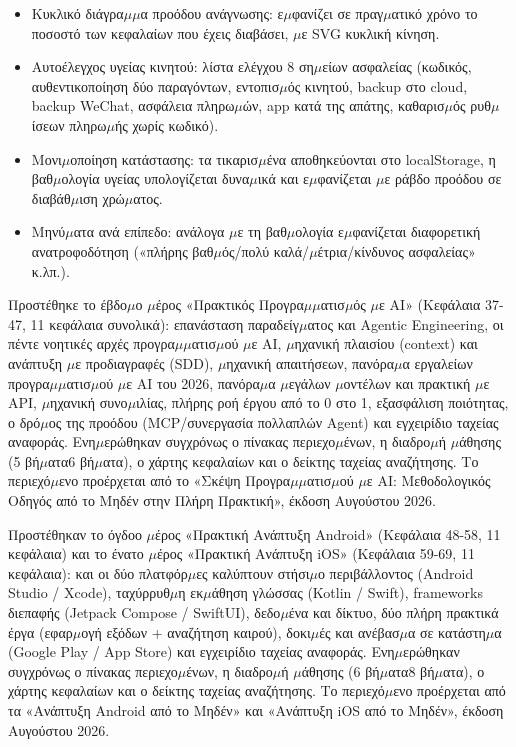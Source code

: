 \begin{itemize}
  \item Κυκλικό διάγρα$\mu$$\mu$α προόδου ανάγνωσης: ε$\mu$φανίζει σε πραγ$\mu$ατικό χρόνο το ποσοστό των κεφαλαίων που έχεις διαβάσει, $\mu$ε SVG κυκλική κίνηση.
  \item Αυτοέλεγχος υγείας κινητού: λίστα ελέγχου 8 ση$\mu$είων ασφαλείας (κωδικός, αυθεντικοποίηση δύο παραγόντων, εντοπισ$\mu$ός κινητού, backup στο cloud, backup WeChat, ασφάλεια πληρω$\mu$ών, app κατά της απάτης, καθαρισ$\mu$ός ρυθ$\mu$ίσεων πληρω$\mu$ής χωρίς κωδικό).
  \item Μονι$\mu$οποίηση κατάστασης: τα τικαρισ$\mu$ένα αποθηκεύονται στο localStorage, η βαθ$\mu$ολογία υγείας υπολογίζεται δυνα$\mu$ικά και ε$\mu$φανίζεται $\mu$ε ράβδο προόδου σε διαβάθ$\mu$ιση χρώ$\mu$ατος.
  \item Μηνύ$\mu$ατα ανά επίπεδο: ανάλογα $\mu$ε τη βαθ$\mu$ολογία ε$\mu$φανίζεται διαφορετική ανατροφοδότηση («πλήρης βαθ$\mu$ός/πολύ καλά/$\mu$έτρια/κίνδυνος ασφαλείας» κ.λπ.).
\end{itemize}


Προστέθηκε το έβδο$\mu$ο $\mu$έρος «Πρακτικός Προγρα$\mu$$\mu$ατισ$\mu$ός $\mu$ε AI» (Κεφάλαια 37-47, 11 κεφάλαια συνολικά): επανάσταση παραδείγ$\mu$ατος και Agentic Engineering, οι πέντε νοητικές αρχές προγρα$\mu$$\mu$ατισ$\mu$ού $\mu$ε AI, $\mu$ηχανική πλαισίου (context) και ανάπτυξη $\mu$ε προδιαγραφές (SDD), $\mu$ηχανική απαιτήσεων, πανόρα$\mu$α εργαλείων προγρα$\mu$$\mu$ατισ$\mu$ού $\mu$ε AI του 2026, πανόρα$\mu$α $\mu$εγάλων $\mu$οντέλων και πρακτική $\mu$ε API, $\mu$ηχανική συνο$\mu$ιλίας, πλήρης ροή έργου από το 0 στο 1, εξασφάλιση ποιότητας, ο δρό$\mu$ος της προόδου (MCP/συνεργασία πολλαπλών Agent) και εγχειρίδιο ταχείας αναφοράς. Ενη$\mu$ερώθηκαν συγχρόνως ο πίνακας περιεχο$\mu$ένων, η διαδρο$\mu$ή $\mu$άθησης (5 βή$\mu$ατα6 βή$\mu$ατα), ο χάρτης κεφαλαίων και ο δείκτης ταχείας αναζήτησης. Το περιεχό$\mu$ενο προέρχεται από το «Σκέψη Προγρα$\mu$$\mu$ατισ$\mu$ού $\mu$ε AI: Μεθοδολογικός Οδηγός από το Μηδέν στην Πλήρη Πρακτική», έκδοση Αυγούστου 2026.

Προστέθηκαν το όγδοο $\mu$έρος «Πρακτική Ανάπτυξη Android» (Κεφάλαια 48-58, 11 κεφάλαια) και το ένατο $\mu$έρος «Πρακτική Ανάπτυξη iOS» (Κεφάλαια 59-69, 11 κεφάλαια): και οι δύο πλατφόρ$\mu$ες καλύπτουν στήσι$\mu$ο περιβάλλοντος (Android Studio / Xcode), ταχύρρυθ$\mu$η εκ$\mu$άθηση γλώσσας (Kotlin / Swift), frameworks διεπαφής (Jetpack Compose / SwiftUI), δεδο$\mu$ένα και δίκτυο, δύο πλήρη πρακτικά έργα (εφαρ$\mu$ογή εξόδων + αναζήτηση καιρού), δοκι$\mu$ές και ανέβασ$\mu$α σε κατάστη$\mu$α (Google Play / App Store) και εγχειρίδιο ταχείας αναφοράς. Ενη$\mu$ερώθηκαν συγχρόνως ο πίνακας περιεχο$\mu$ένων, η διαδρο$\mu$ή $\mu$άθησης (6 βή$\mu$ατα8 βή$\mu$ατα), ο χάρτης κεφαλαίων και ο δείκτης ταχείας αναζήτησης. Το περιεχό$\mu$ενο προέρχεται από τα «Ανάπτυξη Android από το Μηδέν» και «Ανάπτυξη iOS από το Μηδέν», έκδοση Αυγούστου 2026.

